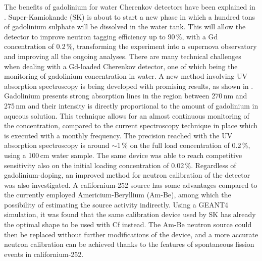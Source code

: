 The benefits of gadolinium for water Cherenkov detectors have been explained in .
Super-Kamiokande (SK) is about to start a new phase in which a hundred tons of gadolinium sulphate %
will be dissolved in the water tank.
This will allow the detector to improve neutron tagging efficiency up to 90\,\%, with a Gd concentration of 0.2\,\%, %
transforming the experiment into a supernova observatory %
and improving all the ongoing analyses.
There are many technical challenges when dealing with a Gd-loaded Cherenkov detector, %
one of which being the monitoring of gadolinium concentration in water.
A new method involving UV absorption spectroscopy is being developed with promising results, %
as shown in .
Gadolinium presents strong absorption lines in the region between 270\,nm and 275\,nm %
and their intensity is directly proportional to the amount of gadolinium in aqueous solution.
This technique allows for an almost continuous monitoring of the concentration, %
compared to the current spectroscopy technique in place which is executed with a monthly frequency.
The precision reached with the UV absorption spectroscopy is around $\sim$1\,\% %
on the full load concentration of 0.2\,\%, using a 100\,cm water sample.
The same device was able to reach competitive sensitivity also on the initial loading concentration of 0.02\,\%.
Regardless of gadolinium-doping, an improved method for neutron calibration of the detector was also investigated.
A californium-252 source has some advantages compared to the currently employed Americium-Beryllium (Am-Be), %
among which the possibility of estimating the source activity indirectly.
Using a GEANT4 simulation, it was found that the same calibration device used by SK %
has already the optimal shape to be used with Cf instead.
The Am-Be neutron source could then be replaced without further modifications of the device, %
and a more accurate neutron calibration can be achieved thanks to the features of spontaneous fission events in californium-252.

